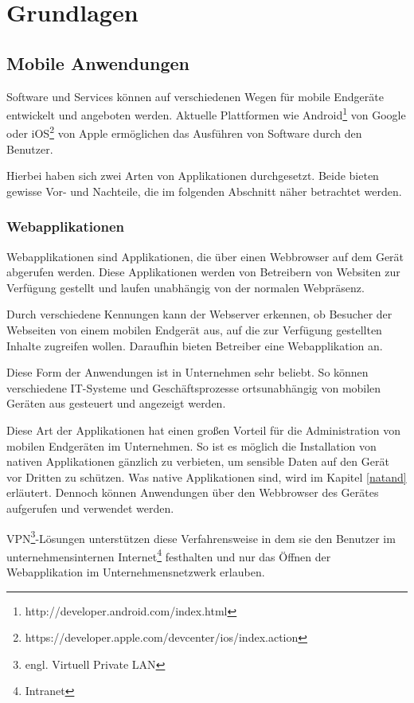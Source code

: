 \section{Grundlagen}

\subsection{Mobile Anwendungen}

Software und Services können auf verschiedenen Wegen für mobile Endgeräte entwickelt und angeboten werden. Aktuelle Plattformen wie Android\footnote{http://developer.android.com/index.html} von Google oder iOS\footnote{https://developer.apple.com/devcenter/ios/index.action} von Apple ermöglichen das Ausführen von Software durch den Benutzer.

Hierbei haben sich zwei Arten von Applikationen durchgesetzt. Beide bieten gewisse Vor- und Nachteile, die im folgenden Abschnitt näher betrachtet werden.

\subsubsection{Webapplikationen}

Webapplikationen sind Applikationen, die über einen Webbrowser auf dem Gerät abgerufen werden. Diese Applikationen werden von Betreibern von Websiten zur Verfügung gestellt und laufen unabhängig von der normalen Webpräsenz.

Durch verschiedene Kennungen kann der Webserver erkennen, ob Besucher der Webseiten von einem mobilen Endgerät aus, auf die zur Verfügung gestellten Inhalte zugreifen wollen. Daraufhin bieten Betreiber eine Webapplikation an.

Diese Form der Anwendungen ist in Unternehmen sehr beliebt. So können verschiedene IT-Systeme und Geschäftsprozesse ortsunabhängig von mobilen Geräten aus gesteuert und angezeigt werden.

Diese Art der Applikationen hat einen großen Vorteil für die Administration von mobilen Endgeräten im Unternehmen. So ist es möglich die Installation von nativen Applikationen gänzlich zu verbieten, um sensible Daten auf den Gerät vor Dritten zu schützen. Was native Applikationen sind, wird im Kapitel \ref{natand} erläutert. Dennoch können Anwendungen über den Webbrowser des Gerätes aufgerufen und verwendet werden.

VPN\footnote{engl. Virtuell Private LAN}-Lösungen unterstützen diese Verfahrensweise in dem sie den Benutzer im unternehmensinternen Internet\footnote{Intranet} festhalten und nur das Öffnen der Webapplikation im Unternehmensnetzwerk erlauben.

